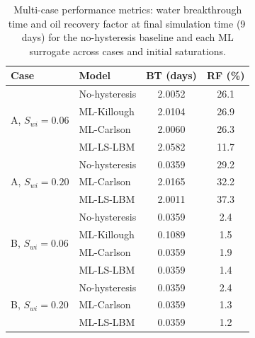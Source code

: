 %

\begin{table}[h]
\centering
\caption{Multi-case performance metrics: water breakthrough time and
oil recovery factor at final simulation time (9\,days) for the
no-hysteresis baseline and each ML surrogate across cases and initial
saturations.}
\label{tab:multicase}
\begin{tabular}{llcc}
\hline
\textbf{Case} & \textbf{Model} & \textbf{BT (days)} & \textbf{RF (\%)} \\
\hline
\multirow{4}{*}{A, $S_{wi}=0.06$}
  & No-hysteresis & 2.0052 & 26.1 \\
  & ML-Killough   & 2.0104 & 26.9 \\
  & ML-Carlson    & 2.0060 & 26.3 \\
  & ML-LS-LBM    & 2.0582 & 11.7 \\
\hline
\multirow{3}{*}{A, $S_{wi}=0.20$}
  & No-hysteresis & 0.0359 & 29.2 \\
  & ML-Carlson    & 2.0165 & 32.2 \\
  & ML-LS-LBM    & 2.0011 & 37.3 \\
\hline
\multirow{4}{*}{B, $S_{wi}=0.06$}
  & No-hysteresis & 0.0359 &  2.4 \\
  & ML-Killough   & 0.1089 &  1.5 \\
  & ML-Carlson    & 0.0359 &  1.9 \\
  & ML-LS-LBM    & 0.0359 &  1.4 \\
\hline
\multirow{3}{*}{B, $S_{wi}=0.20$}
  & No-hysteresis & 0.0359 &  2.4 \\
  & ML-Carlson    & 0.0359 &  1.3 \\
  & ML-LS-LBM    & 0.0359 &  1.2 \\
\hline
\end{tabular}
\end{table}

